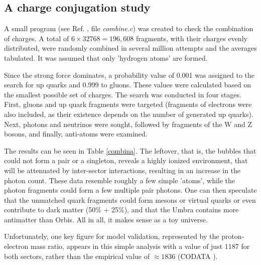 \documentclass[12pt,english]{article}
\begin{document}
\subsection{A charge conjugation study}

A small program (see Ref. \cite{af_neto}, file \emph{combine.c}) was created to check the combination of charges. A total of $6\times32768=196,608$ fragments, with their charges evenly distributed, were randomly combined in several million attempts and the averages tabulated. It was assumed that only 'hydrogen atoms' are formed.

Since the strong force dominates, a probability value of 0.001 was assigned to the search for up quarks and 0.999 to gluons. These values were calculated based on the smallest possible set of charges. The search was conducted in four stages. First, gluons and up quark fragments were targeted (fragments of electrons were also included, as their existence depends on the number of generated up quarks). Next, photons and neutrinos were sought, followed by fragments of the W and Z bosons, and finally, anti-atoms were examined.

The results can be seen in Table \ref{combina}. The leftover, that is, the bubbles that could not form a pair or a singleton, reveals a highly ionized environment, that will be attenuated by inter-sector
interactions, resulting in an increase in the photon count. These data resemble roughly a few simple 'atoms', while the photon fragments could form a few multiple pair photons. One can then speculate that the unmatched quark fragments could form mesons or virtual quarks or even contribute to dark matter (50\% + 25\%), and that the Umbra contains more antimatter than Orbis. All in all, it makes sense as a toy universe. 

Unfortunately, one key figure for model validation, represented by the proton-electron mass ratio, appears in this simple analysis with a value of just $1187$ for both sectors, rather than the empirical value of $\approx1836$ (CODATA \cite{codata}). 
\end{document}
